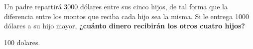 Un padre repartirá 3000 dólares entre sus cinco hijos, de tal forma que la diferencia entre los montos que reciba cada hijo sea la misma.
Si le entrega 1000 dólares a su hijo mayor,
\textbf{¿cuánto dinero recibirán los otros cuatro hijos?}

\begin{solutionbox}{2cm}
    100 dolares.
\end{solutionbox}